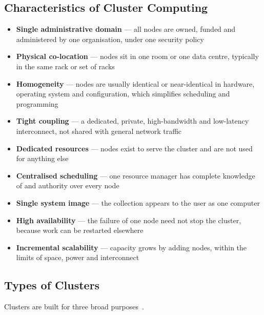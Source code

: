 \subsection{Characteristics of Cluster Computing}

\begin{itemize}
  \item \textbf{Single administrative domain} --- all nodes are owned, funded
        and administered by one organisation, under one security policy
  \item \textbf{Physical co-location} --- nodes sit in one room or one data
        centre, typically in the same rack or set of racks
  \item \textbf{Homogeneity} --- nodes are usually identical or near-identical
        in hardware, operating system and configuration, which simplifies
        scheduling and programming
  \item \textbf{Tight coupling} --- a dedicated, private, high-bandwidth and
        low-latency interconnect, not shared with general network traffic
  \item \textbf{Dedicated resources} --- nodes exist to serve the cluster and
        are not used for anything else
  \item \textbf{Centralised scheduling} --- one resource manager has complete
        knowledge of and authority over every node
  \item \textbf{Single system image} --- the collection appears to the user as
        one computer
  \item \textbf{High availability} --- the failure of one node need not stop
        the cluster, because work can be restarted elsewhere
  \item \textbf{Incremental scalability} --- capacity grows by adding nodes,
        within the limits of space, power and interconnect
\end{itemize}

\subsection{Types of Clusters}

Clusters are built for three broad purposes~.

